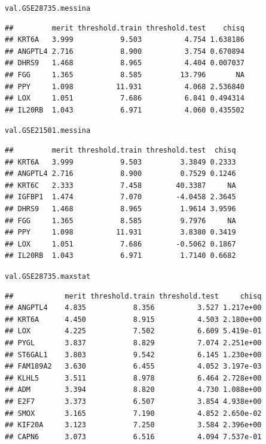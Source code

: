 \documentclass{article}\usepackage[]{graphicx}\usepackage[]{color}
\makeatletter
\newcommand{\hlstd}[1]{\textcolor[rgb]{0.345,0.345,0.345}{#1}}%
\newenvironment{kframe}{%
 \def\at@end@of@kframe{}%
 \ifinner\ifhmode%
  \def\at@end@of@kframe{\end{minipage}}%
  \begin{minipage}{\columnwidth}%
 \fi\fi%
 \def\FrameCommand##1{\hskip\@totalleftmargin \hskip-\fboxsep
 \colorbox{shadecolor}{##1}\hskip-\fboxsep
     \hskip-\linewidth \hskip-\@totalleftmargin \hskip\columnwidth}%
 \MakeFramed {\advance\hsize-\width
   \@totalleftmargin\z@ \linewidth\hsize
   \@setminipage}}%
 {\par\unskip\endMakeFramed%
 \at@end@of@kframe}
\newenvironment{knitrout}{}{} %
\makeatother
\begin{document}
\begin{knitrout}
\begin{kframe}
{\ttfamily\noindent\bfseries{}}\begin{alltt}
\hlstd{val.GSE28735.messina}
\end{alltt}
\begin{verbatim}
##         merit threshold.train threshold.test    chisq
## KRT6A   3.999           9.503          4.754 1.638186
## ANGPTL4 2.716           8.900          3.754 0.670894
## DHRS9   1.468           8.965          4.404 0.007037
## FGG     1.365           8.585         13.796       NA
## PPY     1.098          11.931          4.068 2.536840
## LOX     1.051           7.686          6.841 0.494314
## IL20RB  1.043           6.971          4.060 0.435502
\end{verbatim}
\begin{alltt}
\hlstd{val.GSE21501.messina}
\end{alltt}
\begin{verbatim}
##         merit threshold.train threshold.test  chisq
## KRT6A   3.999           9.503         3.3849 0.2333
## ANGPTL4 2.716           8.900         0.7529 0.1246
## KRT6C   2.333           7.458        40.3387     NA
## IGFBP1  1.474           7.070        -4.0458 2.3645
## DHRS9   1.468           8.965         1.9614 3.9596
## FGG     1.365           8.585         9.7976     NA
## PPY     1.098          11.931         3.8380 0.3419
## LOX     1.051           7.686        -0.5062 0.1867
## IL20RB  1.043           6.971         1.7140 0.6682
\end{verbatim}
\begin{alltt}
\hlstd{val.GSE28735.maxstat}
\end{alltt}
\begin{verbatim}
##            merit threshold.train threshold.test     chisq
## ANGPTL4    4.835           8.356          3.527 1.217e+00
## KRT6A      4.450           8.915          4.503 2.180e+00
## LOX        4.225           7.502          6.609 5.419e-01
## PYGL       3.837           8.829          7.074 2.251e+00
## ST6GAL1    3.803           9.542          6.145 1.230e+00
## FAM189A2   3.630           6.455          4.052 3.197e-03
## KLHL5      3.511           8.978          6.464 2.728e+00
## ADM        3.394           8.820          4.730 1.088e+00
## E2F7       3.373           6.507          3.854 4.938e+00
## SMOX       3.165           7.190          4.852 2.650e-02
## KIF20A     3.123           7.250          3.584 2.396e+00
## CAPN6      3.073           6.516          4.094 7.537e-01

\end{verbatim}
\end{kframe}
\end{knitrout}
\end{document}
